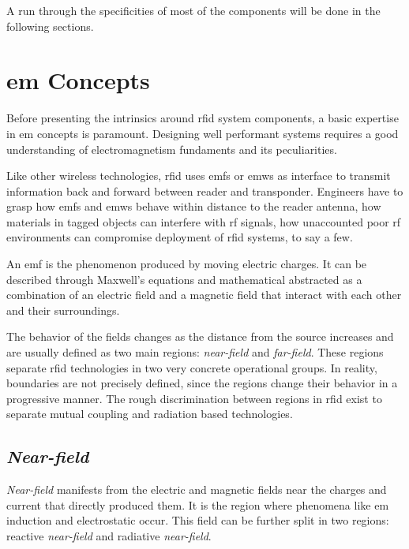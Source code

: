 A run through the specificities of most of the components will be done in the following sections.

\section{\acl{em} Concepts} \label{sec:em}


Before presenting the intrinsics around \ac{rfid} system components, a basic expertise in \ac{em} concepts is paramount.
Designing well performant systems requires a good understanding of electromagnetism fundaments and its peculiarities.

Like other wireless technologies, \ac{rfid} uses \acp{emf} or \acp{emw} as interface to transmit information back and forward between reader and transponder.
Engineers have to grasp how \acp{emf} and \acp{emw} behave within distance to the reader antenna, how materials in tagged objects can interfere with \ac{rf} signals, how unaccounted poor \ac{rf} environments can compromise deployment of \ac{rfid} systems, to say a few.

An \ac{emf} is the phenomenon produced by moving electric charges. It can be described through Maxwell's equations and mathematical abstracted as a combination of an electric field and a magnetic field that interact with each other and their surroundings.

The behavior of the fields changes as the distance from the source increases and are usually defined as two main regions: \emph{near-field} and \emph{far-field}. These regions separate \ac{rfid} technologies in two very concrete operational groups. In reality, boundaries are not precisely defined, since the regions change their behavior in a progressive manner. The rough discrimination between regions in \ac{rfid} exist to separate mutual coupling and radiation based technologies. 

\subsection{\emph{Near-field}}

\emph{Near-field} manifests from the electric and magnetic fields near the charges and current that directly produced them. It is the region where phenomena like \ac{em} induction and electrostatic occur.
This field can be further split in two regions: reactive \emph{near-field} and radiative \emph{near-field}.

